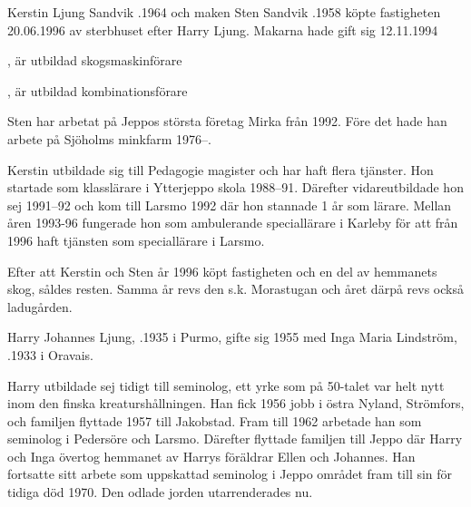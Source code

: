 %



%
Kerstin Ljung Sandvik .1964 och maken Sten Sandvik .1958 köpte fastigheten 20.06.1996 av sterbhuset efter Harry Ljung. Makarna hade gift sig 12.11.1994

\begin{jhchildren}
  \item {}, är utbildad skogsmaskinförare
  \item {}, är utbildad kombinationsförare
\end{jhchildren}

Sten har arbetat på Jeppos största företag Mirka från 1992. Före det hade han arbete på Sjöholms minkfarm 1976--.

Kerstin utbildade sig till Pedagogie magister och har haft flera tjänster. Hon startade som klasslärare i Ytterjeppo skola 1988--91. Därefter vidareutbildade hon sej 1991--92 och kom till Larsmo 1992 där hon stannade 1 år som lärare. Mellan åren 1993-96 fungerade hon som ambulerande speciallärare i Karleby för att från 1996 haft tjänsten som speciallärare i Larsmo.

Efter att Kerstin och Sten år 1996 köpt fastigheten och en del av hemmanets skog, såldes resten. Samma år revs den s.k. Morastugan och året därpå revs också ladugården.


%
Harry Johannes Ljung, .1935 i Purmo, gifte sig 1955 med Inga Maria Lindström, .1933 i Oravais.

Harry utbildade sej tidigt till seminolog, ett yrke som på 50-talet var helt nytt inom den finska kreaturshållningen. Han fick 1956 jobb i östra Nyland, Strömfors, och familjen flyttade 1957 till Jakobstad. Fram till 1962 arbetade han som seminolog i Pedersöre och Larsmo. Därefter flyttade familjen till Jeppo där Harry och Inga övertog hemmanet av Harrys föräldrar Ellen och Johannes. Han fortsatte sitt arbete som uppskattad seminolog i Jeppo området fram till sin för tidiga död 1970. Den odlade jorden utarrenderades nu.

